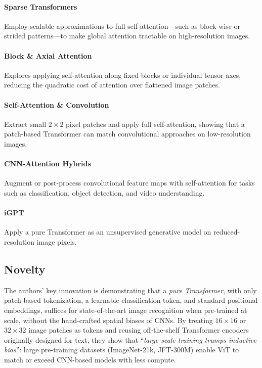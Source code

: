\documentclass[10pt]{article}
\begin{document}
\paragraph{Sparse Transformers \cite{DBLP:journals/corr/abs-1904-10509}} Employ scalable approximations to full self-attention—such as block-wise or strided patterns—to make global attention tractable on high-resolution images.

\paragraph{Block \& Axial Attention \cite{DBLP:journals/corr/abs-1906-02634, DBLP:journals/corr/abs-1912-12180, DBLP:journals/corr/abs-2003-07853}} Explores applying self-attention along fixed blocks or individual tensor axes, reducing the quadratic cost of attention over flattened image patches.

\paragraph{Self-Attention \& Convolution \cite{DBLP:journals/corr/abs-1911-03584}} Extract small \(2\times2\) pixel patches and apply full self-attention, showing that a patch-based Transformer can match convolutional approaches on low-resolution images.

\paragraph{CNN-Attention Hybrids \cite{DBLP:journals/corr/abs-1904-09925, DBLP:journals/corr/abs-2005-12872, Wang_2018_CVPR, DBLP:journals/corr/abs-1904-01766, DBLP:journals/corr/abs-2006-03677}} Augment or post-process convolutional feature maps with self-attention for tasks such as classification, object detection, and video understanding.

\paragraph{iGPT \cite{10.5555/3524938.3525096}} Apply a pure Transformer as an unsupervised generative model on reduced-resolution image pixels.


\subsection*{Novelty}
The authors' key innovation is demonstrating that a \emph{pure Transformer}, with only patch-based tokenization, a learnable classification token, and standard positional embeddings, suffices for state-of-the-art image recognition when pre-trained at scale, without the hand-crafted spatial biases of CNNs. By treating $16\times16$ or $32\times32$ image patches as tokens and reusing off-the-shelf Transformer encoders originally designed for text, they show that ``\emph{large scale training trumps inductive bias}'': large pre-training datasets (ImageNet-21k, JFT-300M) enable ViT to match or exceed CNN-based models with less compute.
\end{document}
